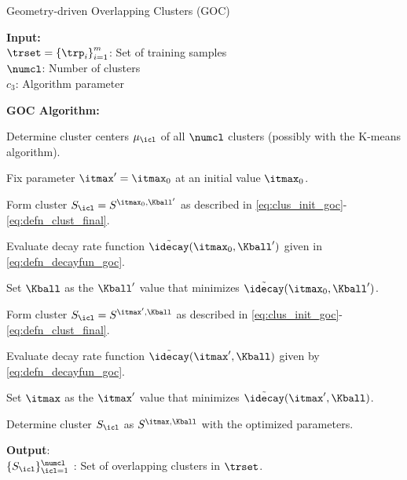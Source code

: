 \documentclass[journal]{IEEEtran}
\begin{document}
\begin{algorithm}[t]
\scriptsize
\caption{Geometry-driven Overlapping Clusters (GOC)}

\begin{algorithmic}[1]

\STATE
\textbf{Input:} \\
$\trset = \left\{\trp_i  \right\}_{i=1}^{m} $: Set of training samples\\
$\numcl$: Number of clusters \\
$c_3$: Algorithm parameter

\STATE
\textbf{GOC Algorithm:}

\STATE
Determine cluster centers $\mu_\icl$ of all $\numcl$ clusters (possibly with the K-means algorithm). 


\STATE
Fix parameter $\itmax'=\itmax_0$ at an initial value $\itmax_0$. 


\STATE
Form cluster $S_\icl = S^{\itmax_0,\Kball'} $ as described in \eqref{eq:clus_init_goc}-\eqref{eq:defn_clust_final}.

\STATE
Evaluate decay rate function $\tilde \idecay(\itmax_0, \Kball') $ given in \eqref{eq:defn_decayfun_goc}. 

\ENDFOR

\STATE
Set $\Kball$ as the $\Kball'$ value that minimizes  $\tilde \idecay(\itmax_0, \Kball') $.


\STATE
Form cluster $S_\icl = S^{\itmax',\Kball} $ as described in \eqref{eq:clus_init_goc}-\eqref{eq:defn_clust_final}.

\STATE
Evaluate decay rate function $\tilde \idecay(\itmax', \Kball) $ given by \eqref{eq:defn_decayfun_goc}. 

\ENDFOR

\STATE
Set $\itmax$ as the $\itmax'$ value that minimizes  $\tilde \idecay(\itmax', \Kball) $.

\STATE
Determine cluster $S_\icl$ as $ S^{\itmax,\Kball}$ with the optimized parameters.

\ENDFOR



\STATE
\textbf{Output}:\\
$\{ S_\icl \}_{\icl=1}^{\numcl}$ : Set of overlapping clusters in $\trset$. \\


\end{algorithmic}
\label{alg:goc}
\end{algorithm}
\end{document}
